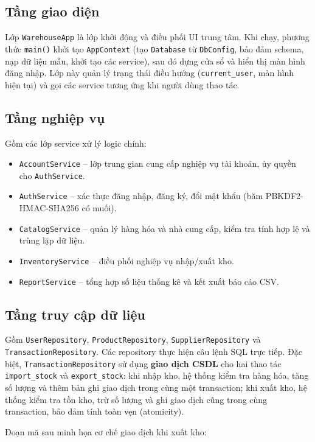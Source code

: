 \documentclass[12pt,a4paper]{report}
\begin{document}
\subsection{Tầng giao diện}
Lớp \texttt{WarehouseApp} là lớp khởi động và điều phối UI trung tâm. Khi chạy,
phương thức \texttt{main()} khởi tạo \texttt{AppContext} (tạo \texttt{Database}
từ \texttt{DbConfig}, bảo đảm schema, nạp dữ liệu mẫu, khởi tạo các service),
sau đó dựng cửa sổ và hiển thị màn hình đăng nhập. Lớp này quản lý trạng thái
điều hướng (\texttt{current\_user}, màn hình hiện tại) và gọi các service tương
ứng khi người dùng thao tác.

\subsection{Tầng nghiệp vụ}
Gồm các lớp service xử lý logic chính:
\begin{itemize}[leftmargin=1.2cm]
  \item \texttt{AccountService} -- lớp trung gian cung cấp nghiệp vụ tài khoản,
  ủy quyền cho \texttt{AuthService}.
  \item \texttt{AuthService} -- xác thực đăng nhập, đăng ký, đổi mật khẩu (băm
  PBKDF2-HMAC-SHA256 có muối).
  \item \texttt{CatalogService} -- quản lý hàng hóa và nhà cung cấp, kiểm tra
  tính hợp lệ và trùng lặp dữ liệu.
  \item \texttt{InventoryService} -- điều phối nghiệp vụ nhập/xuất kho.
  \item \texttt{ReportService} -- tổng hợp số liệu thống kê và kết xuất báo cáo
  CSV.
\end{itemize}

\subsection{Tầng truy cập dữ liệu}
Gồm \texttt{UserRepository}, \texttt{ProductRepository},
\texttt{SupplierRepository} và \texttt{TransactionRepository}. Các repository
thực hiện câu lệnh SQL trực tiếp. Đặc biệt, \texttt{TransactionRepository} sử
dụng \textbf{giao dịch CSDL} cho hai thao tác \texttt{import\_stock} và
\texttt{export\_stock}: khi nhập kho, hệ thống kiểm tra hàng hóa, tăng số lượng
và thêm bản ghi giao dịch trong cùng một transaction; khi xuất kho, hệ thống
kiểm tra tồn kho, trừ số lượng và ghi giao dịch cũng trong cùng transaction,
bảo đảm tính toàn vẹn (atomicity).

Đoạn mã sau minh họa cơ chế giao dịch khi xuất kho:
\end{document}
